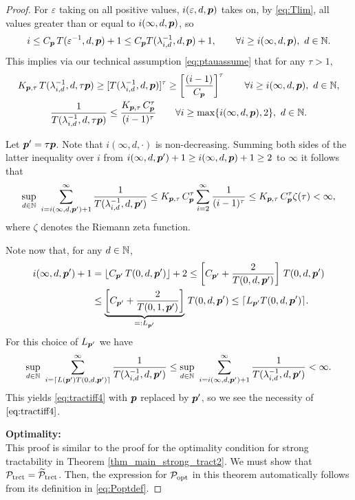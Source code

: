 \documentclass[sort&compress]{elsarticle}
\begin{document}
\begin{proof}
For $\varepsilon$ taking on all positive values, $i(\varepsilon,d,\boldsymbol{p})$ takes on, by \eqref{eq:Tlim}, all values greater than or equal to $i(\infty,d,\boldsymbol{p})$, so
\[
i\le C_{\boldsymbol{p}}\, T(\varepsilon^{-1},d,\boldsymbol{p})+1 \le C_{\boldsymbol{p}} T(\lambda_{i,d}^{-1},d,\boldsymbol{p})+1, \qquad \forall i \ge i(\infty,d,\boldsymbol{p}),  \ d \in \mathbb{N}.
\]
This implies via our technical assumption \eqref{eq:ptauassume} that for any $\tau > 1$,
\begin{gather*}
	K_{\boldsymbol{p},\tau}\,T (\lambda_{i,d}^{-1},d,\tau \boldsymbol{p}) \ge
	[T(\lambda_{i,d}^{-1},d, \boldsymbol{p})]^\tau
	\ge
	\left[\frac{(i-1)}{C_{\boldsymbol{p}}}\right]^\tau \qquad \forall i \ge i(\infty,d,\boldsymbol{p}),  \ d \in \mathbb{N}, \\
	 \frac{1}{T (\lambda_{i,d}^{-1},d,\tau \boldsymbol{p})} \le
	\frac{K_{\boldsymbol{p},\tau}\, C_{\boldsymbol{p}}^\tau}{(i-1)^\tau}\qquad \forall i \ge \max\{i(\infty,d,\boldsymbol{p}),2\},  \ d \in \mathbb{N}.
\end{gather*}

Let $\boldsymbol{p}' = \tau \boldsymbol{p}$.  Note that $i(\infty,d,\cdot)$ is non-decreasing.  Summing both sides of the latter inequality over $i$ from $i(\infty,d,\boldsymbol{p}') + 1 \ge i(\infty,d, \boldsymbol{p}) + 1 \ge 2$ to $\infty$ it follows that
\begin{equation*}
	\sup_{d\in\mathbb{N}} \, \, \sum_{i=i (\infty,d,\boldsymbol{p}')+1}^\infty \frac{1}{T (\lambda_{i,d}^{-1},d,\boldsymbol{p}')}
	 \le  K_{\boldsymbol{p},\tau}\, C_{\boldsymbol{p}}^\tau
	\sum_{i=2}^\infty \frac{1}{(i-1)^\tau} \\
	 \le  K_{\boldsymbol{p},\tau}\, C_{\boldsymbol{p}}^\tau
	\zeta (\tau)  < \infty,
\end{equation*}
where $\zeta$ denotes the Riemann zeta function.


Note now that, for any $d\in\mathbb{N}$,
\begin{align*}
 i(\infty,d,\boldsymbol{p}') +1  & = \lfloor C_{\boldsymbol{p}'}\, T(0,d,\boldsymbol{p}')\rfloor +2 \le  \left[C_{\boldsymbol{p}'} + \frac{2}{T(0,d,\boldsymbol{p}')}   \right]\, T(0,d,\boldsymbol{p}')\\
 & \le  \underbrace{\left[C_{\boldsymbol{p}'} + \frac{2}{T(0,1,\boldsymbol{p}')}   \right]}_{=:L_{\boldsymbol{p}'}}\, T(0,d,\boldsymbol{p}')
 \le \lceil L_{\boldsymbol{p}'} T(0,d,\boldsymbol{p}')\rceil .
\end{align*}
For this choice of $L_{\boldsymbol{p}'}$ we have
\[
\sup_{d\in\mathbb{N}}\,\, \sum_{i=\lceil L(\boldsymbol{p}') T(0,d,\boldsymbol{p}')\rceil}^\infty \frac{1}{T(\lambda_{i,d}^{-1},d, \boldsymbol{p}')}
\le
\sup_{d\in\mathbb{N}} \, \, \sum_{i=i (\infty,d,\boldsymbol{p}')+1}^\infty \frac{1}{T (\lambda_{i,d}^{-1},d,\boldsymbol{p}')} <
\infty.
\]
This yields \eqref{eq:tractiff4} with $\boldsymbol{p}$ replaced by $\boldsymbol{p}'$, so we see the necessity of $\eqref{eq:tractiff4}$.

\bigskip

\noindent \textbf{Optimality:} \\
This proof is similar to the proof for the optimality condition for strong tractability in Theorem \ref{thm_main_strong_tract2}. We must show that $\mathcal{P}_{\textup{trct}} = \widetilde{\mathcal{P}}_{\textup{trct}}$.  Then, the expression for  $\mathcal{P}_{\textup{opt}}$ in this theorem automatically follows from its definition in \eqref{eq:Poptdef}.


\end{proof}
\end{document}
